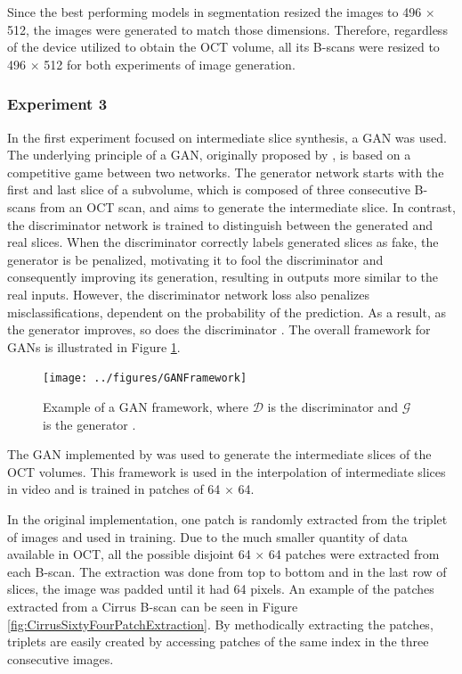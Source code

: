 Since the best performing models in segmentation resized the images to 496 $\times$ 512, the images were generated to match those dimensions. Therefore, regardless of the device utilized to obtain the OCT volume, all its B-scans were resized to 496 $\times$ 512 for both experiments of image generation.

\subsubsection{Experiment 3}
In the first experiment focused on intermediate slice synthesis, a GAN was used. The underlying principle of a GAN, originally proposed by \textcite{Goodfellow2014}, is based on a competitive game between two networks. The generator network starts with the first and last slice of a subvolume, which is composed of three consecutive B-scans from an OCT scan, and aims to generate the intermediate slice. In contrast, the discriminator network is trained to distinguish between the generated and real slices. When the discriminator correctly labels generated slices as fake, the generator is be penalized, motivating it to fool the discriminator and consequently improving its generation, resulting in outputs more similar to the real inputs. However, the discriminator network loss also penalizes misclassifications, dependent on the probability of the prediction. As a result, as the generator improves, so does the discriminator \parencite{Goodfellow2020}. The overall framework for GANs is illustrated in Figure \ref{fig:GANFramework}.

\begin{figure}[!ht]
	\centering
	\texttt{[image: ../figures/GANFramework]}
	\caption{Example of a GAN framework, where $\mathcal{D}$ is the discriminator and $\mathcal{G}$ is the generator \cite{Creswell2018}.}
	\label{fig:GANFramework}
\end{figure}

The GAN implemented by \textcite{Tran2020} was used to generate the intermediate slices of the OCT volumes. This framework is used in the interpolation of intermediate slices in video and is trained in patches of 64 $\times$ 64.
\par
In the original implementation, one patch is randomly extracted from the triplet of images and used in training. Due to the much smaller quantity of data available in OCT, all the possible disjoint 64 $\times$ 64 patches were extracted from each B-scan. The extraction was done from top to bottom and in the last row of slices, the image was padded until it had 64 pixels. An example of the patches extracted from a Cirrus B-scan can be seen in Figure \ref{fig:CirrusSixtyFourPatchExtraction}. By methodically extracting the patches, triplets are easily created by accessing patches of the same index in the three consecutive images.

